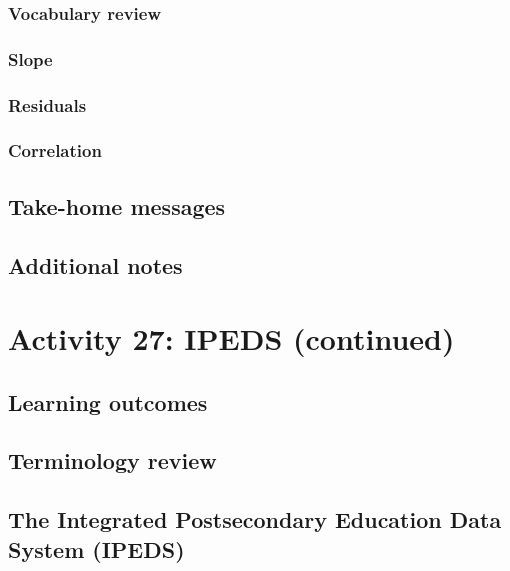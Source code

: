 \documentclass[
]{report}
\begin{document}
\subsubsection*{Vocabulary review}\label{vocabulary-review}

\subsubsection*{Slope}\label{slope-1}

\subsubsection*{Residuals}\label{residuals}

\subsubsection*{Correlation}\label{correlation-1}

\subsection{Take-home messages}\label{take-home-messages-24}

\subsection{Additional notes}\label{additional-notes-25}

\section{Activity 27: IPEDS (continued)}\label{activity-27-ipeds-continued}

\subsection{Learning outcomes}\label{learning-outcomes-31}

\subsection{Terminology review}\label{terminology-review-24}

\subsection{The Integrated Postsecondary Education Data System (IPEDS)}\label{the-integrated-postsecondary-education-data-system-ipeds-1}
\end{document}
